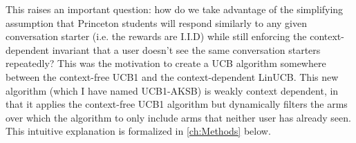 This raises an important question: how do we take advantage of the simplifying assumption that Princeton students will respond similarly to any given conversation starter (i.e. the rewards are I.I.D) while still enforcing the context-dependent invariant that a user doesn't see the same conversation starters repeatedly? This was the motivation to create a UCB algorithm somewhere between the context-free UCB1 and the context-dependent LinUCB. This new algorithm (which I have named UCB1-AKSB) is weakly context dependent, in that it applies the context-free UCB1 algorithm but dynamically filters the arms over which the algorithm to only include arms that neither user has already seen. This intuitive explanation is formalized in \autoref{ch:Methods} below.
